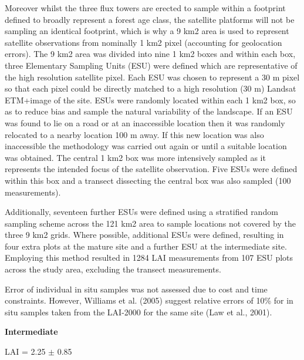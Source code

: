\documentclass[a4paper,11pt]{report}
\begin{document}
Moreover whilst the three flux towers are erected to sample within a footprint defined to broadly represent a forest age class, the satellite platforms will not be sampling an identical footprint, which is why a 9 km2 area is used to represent satellite observations from nominally 1 km2 pixel (accounting for geolocation errors). The 9 km2 area was divided into nine 1 km2 boxes and within each box, three Elementary Sampling Units (ESU) were defined which are representative of the high resolution satellite pixel. Each ESU was chosen to represent a 30 m pixel so that each pixel could be directly matched to a high resolution (30 m) Landsat ETM+image of the site.
ESUs were randomly located within each 1 km2 box, so as to reduce bias and sample the natural variability of the landscape. If an ESU was found to lie on a road or at an inaccessible location then it was randomly relocated to a nearby location 100 m away. If this new location was also inaccessible the methodology was carried out again or until a suitable location was obtained. The central 1 km2 box was more intensively sampled as it represents the intended focus of the satellite observation. Five ESUs were defined within this box and a transect dissecting the central box was also sampled (100 measurements).

Additionally, seventeen further ESUs were defined using a stratified random sampling scheme across the 121 km2 area to sample locations not covered by the three 9 km2 grids. Where possible, additional ESUs were defined, resulting in four extra plots at the mature site and a further ESU at the intermediate site. Employing this method resulted in 1284 LAI measurements from 107 ESU plots across the study area, excluding the transect measurements.

Error of individual in situ samples was not assessed due to cost and time constraints. However, Williams et al. (2005) suggest relative errors of 10\% for in situ samples taken from the LAI-2000 for the same site (Law et al., 2001).

\bigskip
\noindent\textbf{Intermediate}
\bigskip

LAI = 2.25 $\pm$ 0.85 \citep{DeKauwe2011} 
\end{document}
